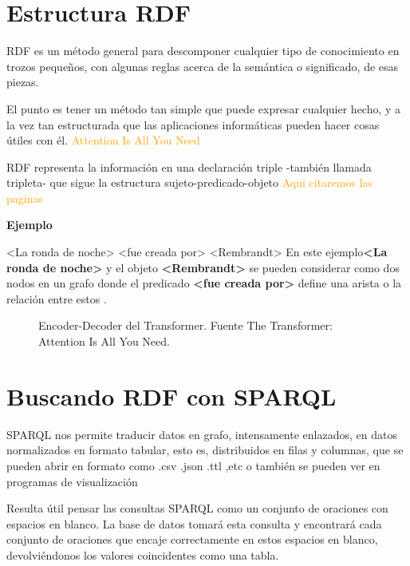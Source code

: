 \documentclass[conference]{IEEEtran}
\begin{document}
\section{Estructura RDF}
RDF es un método general para descomponer cualquier tipo de conocimiento en trozos pequeños, con algunas reglas acerca de la semántica o significado, de esas piezas.

El punto es tener un método tan simple que puede expresar cualquier hecho, y a la vez tan estructurada que las aplicaciones informáticas pueden hacer cosas útiles con él. \textcolor{orange}{Attention Is All You Need} \cite{b1}

RDF representa la información en una declaración triple -también llamada tripleta- que sigue la estructura sujeto-predicado-objeto \textcolor{orange}{Aqui citaremos las paginas} \cite{b1}

\vspace{0.2cm}
\textbf{Ejemplo}

<La ronda de noche> <fue creada por> <Rembrandt>
\vspace{0.2cm}
En este ejemplo\textbf{<La ronda de noche>} y el objeto \textbf{<Rembrandt>} se pueden considerar como dos nodos en un grafo donde el predicado \textbf{<fue creada por>} define una arista o la relación entre estos .

\vspace{0.2cm}


\begin{figure}[h]
\caption{Encoder-Decoder del Transformer. Fuente The Transformer:
Attention Is All You Need. \cite{b1}}
\end{figure}

\vspace{0.2cm}




\vspace{0.2cm}

\section{Buscando RDF con SPARQL}
SPARQL nos permite traducir datos en grafo, intensamente enlazados, en datos normalizados en formato tabular, esto es, distribuidos en filas y columnas, que se pueden abrir  en formato como .csv .json .ttl ,etc o también se pueden ver en programas de visualización


Resulta útil pensar las consultas SPARQL como un conjunto de oraciones con espacios en blanco. La base de datos tomará esta consulta y encontrará cada conjunto de oraciones que encaje correctamente en estos espacios en blanco, devolviéndonos los valores coincidentes como una tabla.
\vspace{0.2cm}
\end{document}
